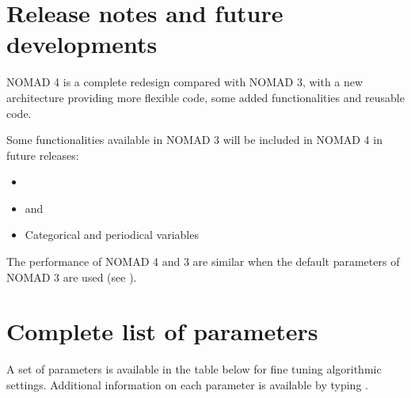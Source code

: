 \documentclass[letterpaper,10pt,english]{sphinxmanual}
\begin{document}
\chapter{Release notes and future developments}
\label{\detokenize{ReleaseNotes:release-notes-and-future-developments}}\label{\detokenize{ReleaseNotes::doc}}
\sphinxAtStartPar
NOMAD 4 is a complete redesign compared with NOMAD 3, with a new architecture providing more flexible code, some added functionalities and reusable code.

\sphinxAtStartPar
Some functionalities available in NOMAD 3 will be included in NOMAD 4 in future releases:
\begin{itemize}
\item {} 
\sphinxAtStartPar
{} 

\item {} 
\sphinxAtStartPar
{}  and  

\item {} 
\sphinxAtStartPar
Categorical  and periodical variables 

\end{itemize}

\sphinxAtStartPar
The performance of NOMAD 4 and 3 are similar when the default parameters of NOMAD 3 are used (see ).

\begin{sphinxShadowBox}
\end{sphinxShadowBox}


\chapter{Complete list of parameters}
\label{\detokenize{Appendix:complete-list-of-parameters}}\label{\detokenize{Appendix:appendix-parameters}}\label{\detokenize{Appendix::doc}}
\sphinxAtStartPar
A set of parameters is available in the table below for fine tuning algorithmic settings. Additional information on each parameter is available by typing .
\end{document}
